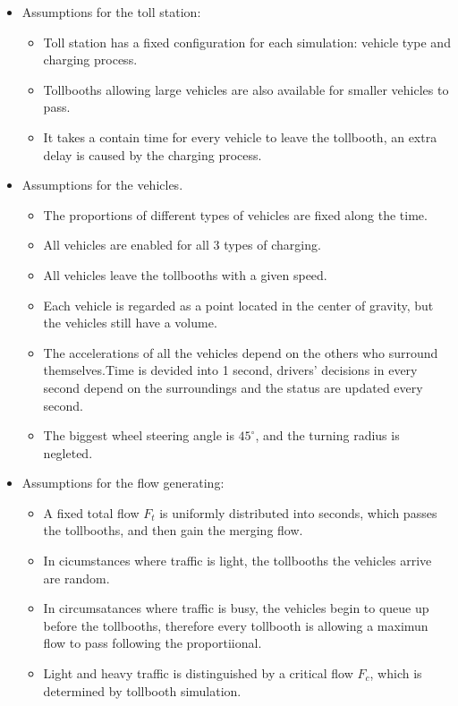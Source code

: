 \documentclass{mcmthesis}
\begin{document}
\begin{itemize}
	\item Assumptions for the toll station:
	\begin{itemize}
         \item Toll station has a fixed configuration for each simulation: vehicle type and charging process.
         \item Tollbooths allowing large vehicles are also available for smaller vehicles to pass.
       	 \item It takes a contain time for every vehicle to leave the tollbooth, an extra delay is caused by the charging process.
	\end{itemize}

    \item Assumptions for the vehicles.
    \begin{itemize}
    	\item The proportions of different types of vehicles are fixed along the time.
    	\item All vehicles are enabled for all 3 types of charging.
    	\item All vehicles leave the tollbooths with a given speed.
    	\item Each vehicle is regarded as a point located in the center of gravity, but the vehicles still have a volume.
    	\item The accelerations of all the vehicles depend on the others who surround themselves.Time is devided into 1 second, drivers' decisions in every second depend on the surroundings and the status are updated every second.
    	\item The biggest wheel steering angle is $45^{\circ}$, and the turning radius is negleted.
    	
    \end{itemize}
    \item Assumptions for the flow generating:
    \begin{itemize}
    \item A fixed total flow $F_t$ is uniformly distributed into seconds, which passes the tollbooths, and then gain the merging flow.
   	\item In cicumstances where traffic is light, the tollbooths the vehicles arrive are random.
    \item In circumsatances where traffic is busy, the vehicles begin to queue up before the tollbooths, therefore every tollbooth is allowing a maximun flow to pass following the proportiional.
    \item Light and heavy traffic is distinguished by a critical flow  $F_c$, which is determined by tollbooth simulation.
    \end{itemize}
	
	
\end{itemize}
\end{document}
